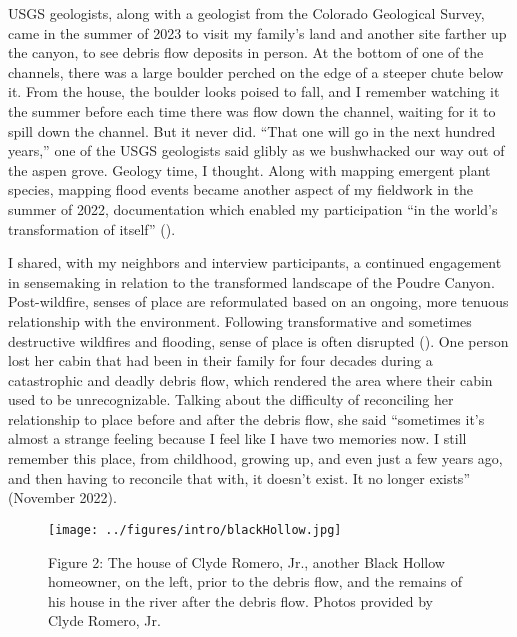 \documentclass[
]{article}
\begin{document}
USGS geologists, along with a geologist from the Colorado Geological Survey, came in the summer of 2023 to visit my family's land and another site farther up the canyon, to see debris flow deposits in person. At the bottom of one of the channels, there was a large boulder perched on the edge of a steeper chute below it. From the house, the boulder looks poised to fall, and I remember watching it the summer before each time there was flow down the channel, waiting for it to spill down the channel. But it never did. ``That one will go in the next hundred years,'' one of the USGS geologists said glibly as we bushwhacked our way out of the aspen grove. Geology time, I thought. Along with mapping emergent plant species, mapping flood events became another aspect of my fieldwork in the summer of 2022, documentation which enabled my participation ``in the world's transformation of itself'' ().

I shared, with my neighbors and interview participants, a continued engagement in sensemaking in relation to the transformed landscape of the Poudre Canyon. Post-wildfire, senses of place are reformulated based on an ongoing, more tenuous relationship with the environment. Following transformative and sometimes destructive wildfires and flooding, sense of place is often disrupted (). One person lost her cabin that had been in their family for four decades during a catastrophic and deadly debris flow, which rendered the area where their cabin used to be unrecognizable. Talking about the difficulty of reconciling her relationship to place before and after the debris flow, she said ``sometimes it's almost a strange feeling because I feel like I have two memories now. I still remember this place, from childhood, growing up, and even just a few years ago, and then having to reconcile that with, it doesn't exist. It no longer exists'' (November 2022).

\begin{figure}
\centering
\texttt{[image: ../figures/intro/blackHollow.jpg]}
\caption{Figure 2: The house of Clyde Romero, Jr., another Black Hollow homeowner, on the left, prior to the debris flow, and the remains of his house in the river after the debris flow. Photos provided by Clyde Romero, Jr.}
\end{figure}
\end{document}

